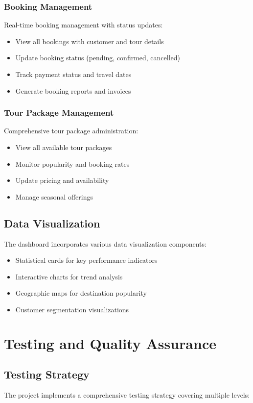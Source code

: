 \documentclass[12pt,a4paper]{article}
\begin{document}
\subsubsection{Booking Management}
Real-time booking management with status updates:
\begin{itemize}
    \item View all bookings with customer and tour details
    \item Update booking status (pending, confirmed, cancelled)
    \item Track payment status and travel dates
    \item Generate booking reports and invoices
\end{itemize}

\subsubsection{Tour Package Management}
Comprehensive tour package administration:
\begin{itemize}
    \item View all available tour packages
    \item Monitor popularity and booking rates
    \item Update pricing and availability
    \item Manage seasonal offerings
\end{itemize}

\subsection{Data Visualization}
The dashboard incorporates various data visualization components:
\begin{itemize}
    \item Statistical cards for key performance indicators
    \item Interactive charts for trend analysis
    \item Geographic maps for destination popularity
    \item Customer segmentation visualizations
\end{itemize}

\newpage

\section{Testing and Quality Assurance}

\subsection{Testing Strategy}
The project implements a comprehensive testing strategy covering multiple levels:
\end{document}
